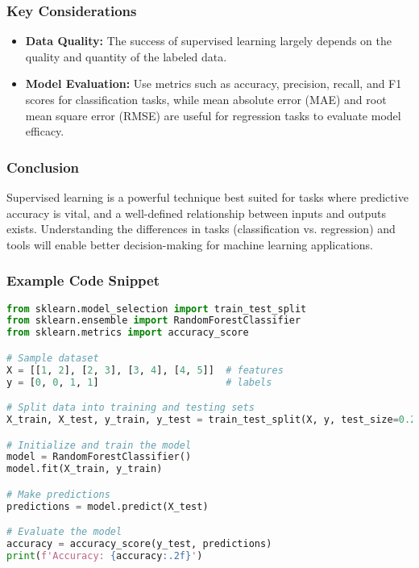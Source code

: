 \documentclass[aspectratio=169]{beamer}
\begin{document}
\begin{frame}[fragile]
    \frametitle{Key Considerations}
    \begin{itemize}
        \item \textbf{Data Quality:} The success of supervised learning largely depends on the quality and quantity of the labeled data.
        \item \textbf{Model Evaluation:} Use metrics such as accuracy, precision, recall, and F1 scores for classification tasks, while mean absolute error (MAE) and root mean square error (RMSE) are useful for regression tasks to evaluate model efficacy.
    \end{itemize}
\end{frame}

\begin{frame}[fragile]
    \frametitle{Conclusion}
    Supervised learning is a powerful technique best suited for tasks where predictive accuracy is vital, and a well-defined relationship between inputs and outputs exists. Understanding the differences in tasks (classification vs. regression) and tools will enable better decision-making for machine learning applications.
\end{frame}

\begin{frame}[fragile]
    \frametitle{Example Code Snippet}
    \begin{lstlisting}[language=Python]
from sklearn.model_selection import train_test_split
from sklearn.ensemble import RandomForestClassifier
from sklearn.metrics import accuracy_score

# Sample dataset
X = [[1, 2], [2, 3], [3, 4], [4, 5]]  # features
y = [0, 0, 1, 1]                      # labels

# Split data into training and testing sets
X_train, X_test, y_train, y_test = train_test_split(X, y, test_size=0.2)

# Initialize and train the model
model = RandomForestClassifier()
model.fit(X_train, y_train)

# Make predictions
predictions = model.predict(X_test)

# Evaluate the model
accuracy = accuracy_score(y_test, predictions)
print(f'Accuracy: {accuracy:.2f}')
    \end{lstlisting}
\end{frame}
\end{document}
